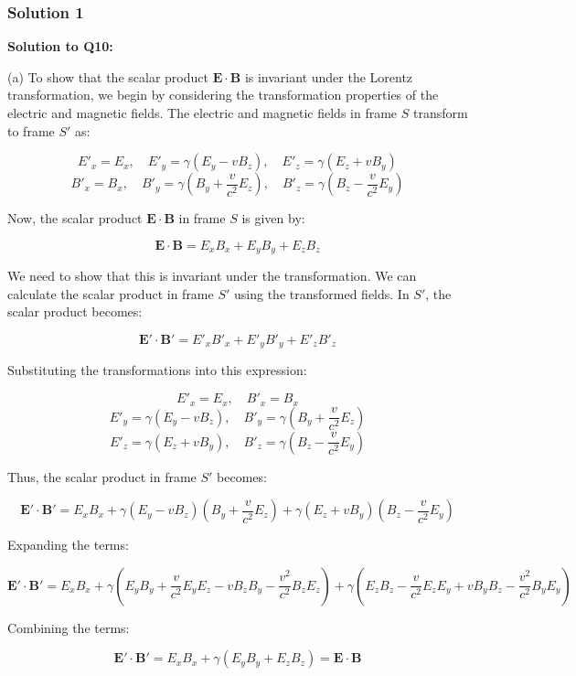 \documentclass{article}
\begin{document}
\subsubsection{Solution 1}
\textbf{Solution to Q10:}

(a) To show that the scalar product \( \mathbf{E} \cdot \mathbf{B} \) is invariant under the Lorentz transformation, we begin by considering the transformation properties of the electric and magnetic fields. The electric and magnetic fields in frame \( S \) transform to frame \( S' \) as:

\[
E'_x = E_x, \quad E'_y = \gamma (E_y - v B_z), \quad E'_z = \gamma (E_z + v B_y)
\]
\[
B'_x = B_x, \quad B'_y = \gamma \left( B_y + \frac{v}{c^2} E_z \right), \quad B'_z = \gamma \left( B_z - \frac{v}{c^2} E_y \right)
\]

Now, the scalar product \( \mathbf{E} \cdot \mathbf{B} \) in frame \( S \) is given by:

\[
\mathbf{E} \cdot \mathbf{B} = E_x B_x + E_y B_y + E_z B_z
\]

We need to show that this is invariant under the transformation. We can calculate the scalar product in frame \( S' \) using the transformed fields. In \( S' \), the scalar product becomes:

\[
\mathbf{E'} \cdot \mathbf{B'} = E'_x B'_x + E'_y B'_y + E'_z B'_z
\]

Substituting the transformations into this expression:

\[
E'_x = E_x, \quad B'_x = B_x
\]
\[
E'_y = \gamma (E_y - v B_z), \quad B'_y = \gamma \left( B_y + \frac{v}{c^2} E_z \right)
\]
\[
E'_z = \gamma (E_z + v B_y), \quad B'_z = \gamma \left( B_z - \frac{v}{c^2} E_y \right)
\]

Thus, the scalar product in frame \( S' \) becomes:

\[
\mathbf{E'} \cdot \mathbf{B'} = E_x B_x + \gamma (E_y - v B_z) \left( B_y + \frac{v}{c^2} E_z \right) + \gamma (E_z + v B_y) \left( B_z - \frac{v}{c^2} E_y \right)
\]

Expanding the terms:

\[
\mathbf{E'} \cdot \mathbf{B'} = E_x B_x + \gamma \left( E_y B_y + \frac{v}{c^2} E_y E_z - v B_z B_y - \frac{v^2}{c^2} B_z E_z \right)
+ \gamma \left( E_z B_z - \frac{v}{c^2} E_z E_y + v B_y B_z - \frac{v^2}{c^2} B_y E_y \right)
\]

Combining the terms:

\[
\mathbf{E'} \cdot \mathbf{B'} = E_x B_x + \gamma \left( E_y B_y + E_z B_z \right)
= \mathbf{E} \cdot \mathbf{B}
\]
\end{document}
